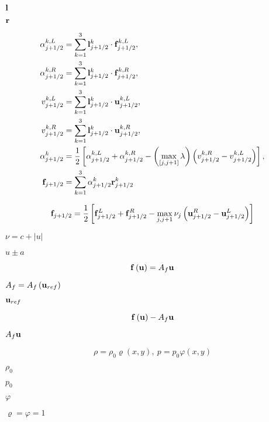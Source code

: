 \documentclass{article}
\begin{document}
${\bf l}$
\pagebreak

${\bf r}$
\pagebreak

\begin{align} \alpha_{j+1/2}^{k,L} &= \sum_{k=1}^3 {\bf l}_{j+1/2}^k \cdot {\bf f}_{j+1/2}^{k,L}, \\ \alpha_{j+1/2}^{k,R} &= \sum_{k=1}^3 {\bf l}_{j+1/2}^k \cdot {\bf f}_{j+1/2}^{k,R}, \\ v_{j+1/2}^{k,L} &= \sum_{k=1}^3 {\bf l}_{j+1/2}^k \cdot {\bf u}_{j+1/2}^{k,L}, \\ v_{j+1/2}^{k,R} &= \sum_{k=1}^3 {\bf l}_{j+1/2}^k \cdot {\bf u}_{j+1/2}^{k,R}, \\ \alpha_{j+1/2}^k &= \frac{1}{2}\left[ \alpha_{j+1/2}^{k,L} + \alpha_{j+1/2}^{k,R} - \left(\max_{\left[j,j+1\right]} \lambda\right) \left( v_{j+1/2}^{k,R} - v_{j+1/2}^{k,L} \right) \right], \\ {\bf f}_{j+1/2} &= \sum_{k=1}^3 \alpha_{j+1/2}^k {\bf r}_{j+1/2}^k \end{align}
\pagebreak

\begin{equation} {\bf f}_{j+1/2} = \frac{1}{2}\left[ {\bf f}_{j+1/2}^L + {\bf f}_{j+1/2}^R - \max_{j,j+1} \nu_j \left( {\bf u}_{j+1/2}^R - {\bf u}_{j+1/2}^L \right)\right] \end{equation}
\pagebreak

$\nu = c + \left|u\right|$
\pagebreak

$ u\pm a$
\pagebreak

\begin{equation} {\bf f}\left({\bf u}\right) = A_f{\bf u} \end{equation}
\pagebreak

$A_f = A_f\left({\bf u}_{ref}\right)$
\pagebreak

${\bf u}_{ref}$
\pagebreak

\begin{equation} {\bf f}\left({\bf u}\right) - A_f{\bf u} \end{equation}
\pagebreak

$A_f{\bf u}$
\pagebreak

\begin{equation} \rho = \rho_0\varrho\left(x,y\right),\ p = p_0\varphi\left(x,y\right) \end{equation}
\pagebreak

$\rho_0$
\pagebreak

$p_0$
\pagebreak

$\varphi$
\pagebreak

$\varrho = \varphi = 1$
\pagebreak
\end{document}

